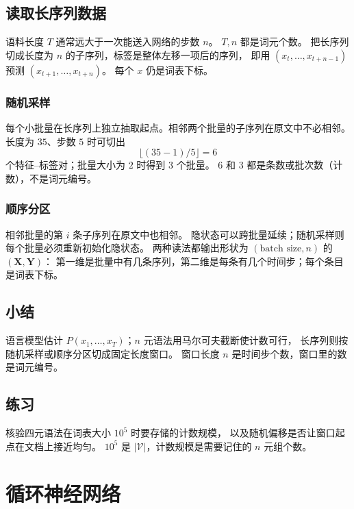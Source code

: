 \subsection{读取长序列数据}

语料长度 $T$ 通常远大于一次能送入网络的步数 $n$。
$T,n$ 都是词元个数。
把长序列切成长度为 $n$ 的子序列，标签是整体左移一项后的序列，
即用 $(x_t,\ldots,x_{t+n-1})$ 预测 $(x_{t+1},\ldots,x_{t+n})$。
每个 $x$ 仍是词表下标。

\subsubsection{随机采样}

每个小批量在长序列上独立抽取起点。相邻两个批量的子序列在原文中不必相邻。
长度为 $35$、步数 $5$ 时可切出
\[
\bigl\lfloor(35-1)/5\bigr\rfloor=6
\]
个特征--标签对；批量大小为 $2$ 时得到 $3$ 个批量。
$6$ 和 $3$ 都是条数或批次数（计数），不是词元编号。

\subsubsection{顺序分区}

相邻批量的第 $i$ 条子序列在原文中也相邻。
隐状态可以跨批量延续；随机采样则每个批量必须重新初始化隐状态。
两种读法都输出形状为 $(\text{batch size},n)$ 的 $(\bm{X},\bm{Y})$：
第一维是批量中有几条序列，第二维是每条有几个时间步；每个条目是词表下标。

\subsection{小结}

语言模型估计 $P(x_1,\ldots,x_T)$；$n$ 元语法用马尔可夫截断使计数可行，
长序列则按随机采样或顺序分区切成固定长度窗口。
窗口长度 $n$ 是时间步个数，窗口里的数是词元编号。

\subsection{练习}

核验四元语法在词表大小 $10^5$ 时要存储的计数规模，
以及随机偏移是否让窗口起点在文档上接近均匀。
$10^5$ 是 $|\mathcal{V}|$，计数规模是需要记住的 $n$ 元组个数。

\section{循环神经网络}


